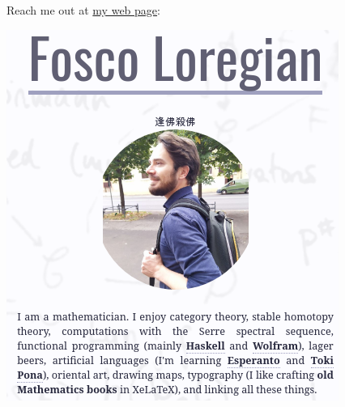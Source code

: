 \documentclass[handout]{beamer}
\begin{document}
%
\begin{frame}
Reach me out at \href{http://tetrapharmakon.github.io}{my web page}:
\begin{center}
\href{http://tetrapharmakon.github.io}{
\includegraphics[width=.2\textwidth]{crop1.png}
}
\end{center}
\end{frame}
%
%
%
%
%
\end{document}
